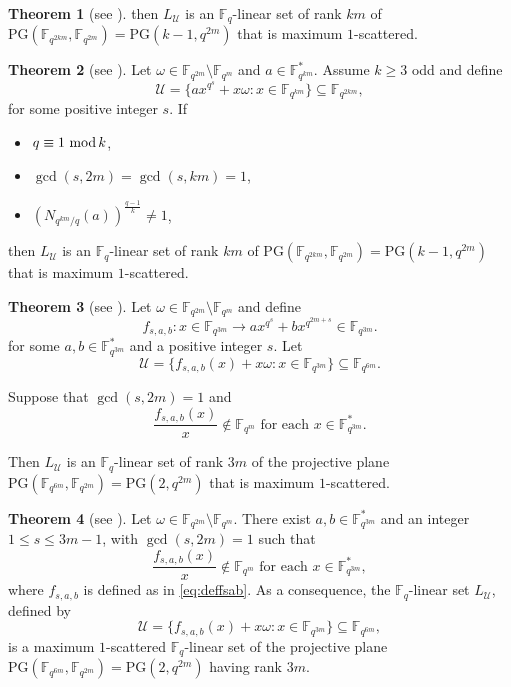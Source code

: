 \documentclass[11pt]{amsart}
\theoremstyle{definition}
\newtheorem{theorem}{Theorem}[section]
\newcommand{\F}{{\mathbb F}}
\newcommand{\U}{{\mathcal{U}}}
\renewcommand{\mod}{\hbox{{\rm mod}\,}}
\newcommand{\PG}{\mathrm{PG}}
\begin{document}
{\begin{theorem} [see \textnormal{\cite[Theorem 2.2]{bartoli2018maximum}}]
then $L_{\U}$ is an $\F_q$-linear set of rank $km$ of $\PG\left(\F_{q^{2km}},\F_{q^{2m}}\right)=\PG(k-1,q^{2m})$ that is maximum $1$-scattered.    
\end{theorem}

\begin{theorem} [see \textnormal{\cite[Theorem 2.3]{bartoli2018maximum}}]\label{th:masxcattkodd2}
Let $\omega \in \F_{q^{2m}} \setminus \F_{q^{m}}$ and $a \in \F_{q^{km}}^*$. Assume $k \geq 3$ odd and define
\[
\U=\{ ax^{q^s}+x\omega \colon x \in  \F_{q^{km}}\} \subseteq \F_{q^{2km}},
\]
for some positive integer $s$.
If 
 \begin{itemize}
        \item $q \equiv 1 \ \mod k$,
       \item $\gcd(s,2m)=\gcd(s,km)=1$,
       \item $\left(N_{q^{km}/q}(a)\right)^{\frac{q-1}{k}} \neq 1$,
    \end{itemize}
then $L_{\U}$ is an $\F_q$-linear set of rank $km$ of $\PG\left(\F_{q^{2km}},\F_{q^{2m}}\right)=\PG(k-1,q^{2m})$ that is maximum $1$-scattered.    
\end{theorem}



\begin{theorem}  [see \textnormal{\cite[Proposition 2.7]{bartoli2018maximum}}] \label{th:maximumscattered3}
    Let $\omega \in \F_{q^{2m}} \setminus \F_{q^{m}}$ and define \begin{equation} \label{eq:deffsab}
f_{s,a,b}:x \in \F_{q^{3m}} \rightarrow ax^{q^s}+bx^{q^{2m+s}} \in \F_{q^{3m}}.
\end{equation}
for some $a,b \in \F_{q^{3m}}^*$ and a positive integer $s$. Let
\[\U=\{ f_{s,a,b}(x)+x\omega \colon x \in  \F_{q^{3m}}\}\subseteq \F_{q^{6m}}.\]

Suppose that $\gcd(s,2m)=1$ and
\[
\frac{f_{s,a,b}(x)}{x} \notin \F_{q^m} \mbox{ for each }x \in \F_{q^{3m}}^*.
\]

Then $L_{\U}$ is an $\F_q$-linear set of rank $3m$ of the projective plane $\PG\left(\F_{q^{6m}},\F_{q^{2m}}\right)=\PG(2,q^{2m})$ that is maximum $1$-scattered.  
\end{theorem}


\begin{theorem} [see \textnormal{\cite[Theorem 2.4]{csajbok2017maximum}}]
    Let $\omega \in \F_{q^{2m}} \setminus \F_{q^{m}}$. There
exist $a, b \in  \F_{q^{3m}}^*$ and an integer $1 \leq s \leq 3m-1$, with $\gcd(s,2m)=1$ such that
\[
\frac{f_{s,a,b}(x)}{x} \notin \F_{q^m} \mbox{ for each }x \in \F_{q^{3m}}^*,
\]
where $f_{s,a,b}$ is defined as in \eqref{eq:deffsab}.
As a consequence, the $\F_q$-linear set $L_{\U}$, defined by
\[
\U=\{ f_{s,a,b}(x)+x\omega \colon x \in  \F_{q^{3m}}\} \subseteq \F_{q^{6m}},
\]
is a maximum $1$-scattered $\F_q$-linear set of the projective plane $\PG(\F_{q^{6m}},\F_{q^{2m}})=\PG(2,q^{2m})$ having rank $3m$.
\end{theorem}

}
\end{document}
